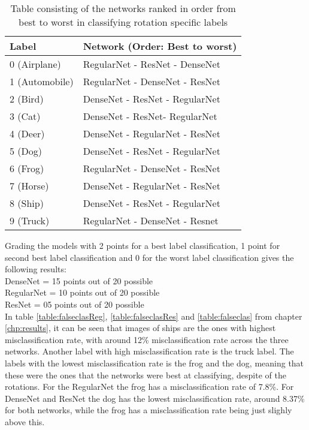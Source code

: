 \begin{table}[]
	\centering
	\caption{Table consisting of the networks ranked in order from best to worst in classifying rotation specific labels}
	\label{table:results}
	\begin{tabular}{|l|l|}
		\hline
		Label          & Network (Order: Best to worst) \\ \hline
		0 (Airplane)   & RegularNet - ResNet - DenseNet \\ \hline
		1 (Automobile) & RegularNet - DenseNet - ResNet \\ \hline
		2 (Bird)       & DenseNet - ResNet - RegularNet \\ \hline
		3 (Cat)        & DenseNet - ResNet- RegularNet  \\ \hline
		4 (Deer)       & DenseNet - RegularNet - ResNet \\ \hline
		5 (Dog)        & DenseNet - ResNet - RegularNet \\ \hline
		6 (Frog)       & RegularNet - DenseNet - ResNet \\ \hline
		7 (Horse)      & DenseNet - RegularNet - ResNet \\ \hline
		8 (Ship)       & DenseNet - ResNet - RegularNet \\ \hline
		9 (Truck)      & RegularNet - DenseNet - Resnet \\ \hline
	\end{tabular}
\end{table}
\FloatBarrier

Grading the models with 2 points for a best label classification, 1 point for second best label classification and 0 for the worst label classification gives the following results:\\
DenseNet   = 15 points out of 20 possible\\
RegularNet = 10 points out of 20 possible\\
ResNet     = 05 points out of 20 possible\\

In table \ref{table:falseclasReg}, \ref{table:falseclasRes} and \ref{table:falseclas} from chapter \ref{chp:results}, it can be seen that images of ships are the ones with highest misclassification rate, with around 12\% misclassification rate across the three networks.  Another label with high misclassification rate is the truck label. The labels with the lowest misclassification rate is the frog and the dog, meaning that these were the ones that the networks were best at classifying, despite of the rotations. For the RegularNet the frog has a misclassification rate of 7.8\%. For DenseNet and ResNet the dog has the lowest misclassification rate, around 8.37\% for both networks, while the frog has a misclassification rate being just slighly above this.

